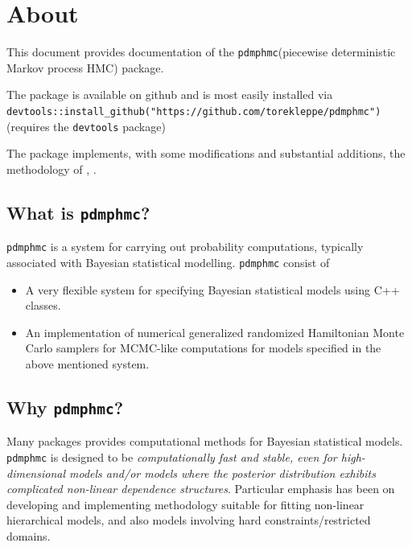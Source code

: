 \documentclass[
]{book}
\begin{document}
\hypertarget{about}{%
\chapter{About}\label{about}}

This document provides documentation of the \texttt{pdmphmc}(piecewise deterministic Markov process HMC) package.

The package is available on github and is most easily installed via \texttt{devtools::install\_github("https://github.com/torekleppe/pdmphmc")} (requires the \texttt{devtools} package)

The package implements, with some modifications and substantial additions, the methodology of \citet{kleppe_CTHMC}, \citet{kleppe_amt}.

\hypertarget{what-is-pdmphmc}{%
\section{\texorpdfstring{What is \texttt{pdmphmc}?}{What is pdmphmc?}}\label{what-is-pdmphmc}}

\texttt{pdmphmc} is a system for carrying out probability computations, typically associated with Bayesian statistical modelling. \texttt{pdmphmc} consist of

\begin{itemize}
\item
  A very flexible system for specifying Bayesian statistical models using C++ classes.
\item
  An implementation of numerical generalized randomized Hamiltonian Monte Carlo samplers for MCMC-like computations for models specified in the above mentioned system.
\end{itemize}

\hypertarget{why-pdmphmc}{%
\section{\texorpdfstring{Why \texttt{pdmphmc}?}{Why pdmphmc?}}\label{why-pdmphmc}}

Many packages provides computational methods for Bayesian statistical models. \texttt{pdmphmc} is designed to be \emph{computationally fast and stable, even for high-dimensional models and/or models where the posterior distribution exhibits complicated non-linear dependence structures}. Particular emphasis has been on developing and implementing methodology suitable for fitting non-linear hierarchical models, and also models involving hard constraints/restricted domains.
\end{document}
